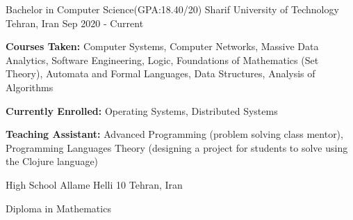 

\begin{cventries}

  \cventry
  {Bachelor in Computer Science(GPA:18.40/20)} %
  {Sharif University of Technology} %
  {Tehran, Iran} %
  {Sep 2020 - Current} %
  {
    \begin{cvitems} %
      \item {\textbf{Courses Taken: }
          Computer Systems, Computer Networks, Massive Data Analytics, Software Engineering,
          Logic, Foundations of Mathematics (Set Theory), Automata and Formal Languages,
          Data Structures, Analysis of Algorithms
        }
\item {\textbf{Currently Enrolled: }
          Operating Systems, Distributed Systems
        }
      \item {\textbf{Teaching Assistant:} Advanced Programming (problem solving
          class mentor), Programming Languages Theory (designing a project for students to solve using the Clojure language)}
    \end{cvitems}
  }

  \cventry
  {High School} %
  {Allame Helli 10} %
  {Tehran, Iran} %
  {}
  {
    \begin{cvitems} %
    \item {Diploma in Mathematics}
    \end{cvitems}
  }
\end{cventries}
